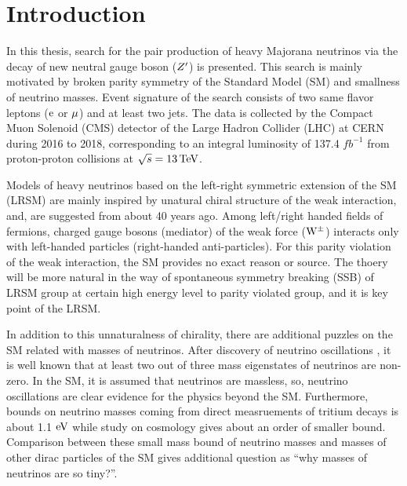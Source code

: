 \chapter{Introduction}
In this thesis, search for the pair production of heavy Majorana neutrinos via the decay of new neutral gauge boson (${Z}^{\prime}$) is presented. This search is mainly motivated by broken parity
symmetry of the Standard Model (SM) and smallness of neutrino masses. Event signature of the search consists of two same flavor leptons ($\mathrm{e}$ or $\mathrm{\mu}$) and at least two jets. The data is collected
by the Compact Muon Solenoid (CMS) detector of the Large Hadron Collider (LHC) at CERN during 2016 to 2018, corresponding to an integral luminosity of 137.4 ${\unit{fb}}^{-1}$ from
proton-proton collisions at $\sqrt{s} = 13 \,\text{Te\hspace{-.08em}V}$.

Models of heavy neutrinos based on the left-right symmetric extension of the SM (LRSM) are mainly inspired by unatural chiral structure of the weak interaction, and,
are suggested from about 40 years ago.  
Among left/right handed fields of fermions, charged gauge bosons (mediator) of the weak force (${\mathrm{W}}^{\pm}$) interacts only with left-handed particles (right-handed anti-particles).
For this parity violation of the weak interaction, the SM provides no exact reason or source. The thoery will be more natural in the way of spontaneous symmetry breaking (SSB) of LRSM group
at certain high energy level to parity violated group, and it is key point of the LRSM.

In addition to this unnaturalness of chirality, there are additional puzzles on the SM related with masses of neutrinos.
After discovery of neutrino oscillations \cite{PhysRevLett.81.1158}, it is well known that at least two out of three mass eigenstates of neutrinos are non-zero.
In the SM, it is assumed that neutrinos are massless, so, neutrino oscillations are clear evidence for the physics beyond the SM. 
Furthermore, bounds on neutrino masses coming from direct measruements of tritium decays \cite{PhysRevLett.123.221802} is about 1.1 \ensuremath{\text{e\hspace{-.08em}V}}\xspace while
study on cosmology \cite{HUT1979144} gives about an order of smaller bound. Comparison between these small mass bound of neutrino masses and masses of other dirac particles of the SM gives
additional question as ``why masses of neutrinos are so tiny?''.

